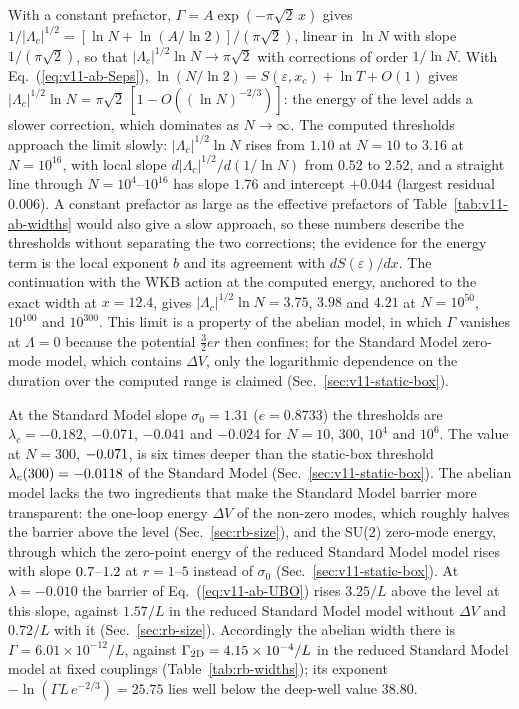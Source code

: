 With a constant prefactor, $\Gamma=A\exp(-\pi\sqrt2\,x)$ gives $1/|\Lambda_c|^{1/2}=[\ln N+\ln(A/\ln2)]/(\pi\sqrt2)$, linear in $\ln N$ with slope $1/(\pi\sqrt2)$, so that $|\Lambda_c|^{1/2}\ln N\to\pi\sqrt2$ with corrections of order $1/\ln N$.
With Eq.~(\ref{eq:v11-ab-Seps}), $\ln(N/\ln2)=S(\varepsilon,x_c)+\ln T+O(1)$ gives $|\Lambda_c|^{1/2}\ln N=\pi\sqrt2\,[1-O((\ln N)^{-2/3})]$: the energy of the level adds a slower correction, which dominates as $N\to\infty$.
The computed thresholds approach the limit slowly: $|\Lambda_c|^{1/2}\ln N$ rises from $1.10$ at $N=10$ to $3.16$ at $N=10^{16}$, with local slope $d|\Lambda_c|^{1/2}/d(1/\ln N)$ from $0.52$ to $2.52$, and a straight line through $N=10^4$--$10^{16}$ has slope $1.76$ and intercept $+0.044$ (largest residual $0.006$). %
A constant prefactor as large as the effective prefactors of Table~\ref{tab:v11-ab-widths} would also give a slow approach, so these numbers describe the thresholds without separating the two corrections; the evidence for the energy term is the local exponent $b$ and its agreement with $dS(\varepsilon)/dx$. %
The continuation with the WKB action at the computed energy, anchored to the exact width at $x=12.4$, gives $|\Lambda_c|^{1/2}\ln N=3.75$, $3.98$ and $4.21$ at $N=10^{50}$, $10^{100}$ and $10^{300}$. %
This limit is a property of the abelian model, in which $\Gamma$ vanishes at $\Lambda=0$ because the potential $\frac32er$ then confines; for the Standard Model zero-mode model, which contains $\Delta V$, only the logarithmic dependence on the duration over the computed range is claimed (Sec.~\ref{sec:v11-static-box}).

At the Standard Model slope $\sigma_0=1.31$ ($e=0.8733$) the thresholds are $\lambda_c=-0.182$, $-0.071$, $-0.041$ and $-0.024$ for $N=10$, $300$, $10^4$ and $10^6$. %
The value at $N=300$, $-0.071$, is six times deeper than the static-box threshold $\lambda_c(300)=-0.0118$ of the Standard Model (Sec.~\ref{sec:v11-static-box}). %
The abelian model lacks the two ingredients that make the Standard Model barrier more transparent: the one-loop energy $\Delta V$ of the non-zero modes, which roughly halves the barrier above the level (Sec.~\ref{sec:rb-size}), and the SU(2) zero-mode energy, through which the zero-point energy of the reduced Standard Model model rises with slope $0.7$--$1.2$ at $r=1$--$5$ instead of $\sigma_0$ (Sec.~\ref{sec:v11-static-box}). %
At $\lambda=-0.010$ the barrier of Eq.~(\ref{eq:v11-ab-UBO}) rises $3.25/L$ above the level at this slope, against $1.57/L$ in the reduced Standard Model model without $\Delta V$ and $0.72/L$ with it (Sec.~\ref{sec:rb-size}). %
Accordingly the abelian width there is $\Gamma=6.01\times10^{-12}/L$, against $\Gamma_{\rm 2D}=4.15\times10^{-4}/L$ in the reduced Standard Model model at fixed couplings (Table~\ref{tab:rb-widths}); its exponent $-\ln(\Gamma L\,e^{-2/3})=25.75$ lies well below the deep-well value $38.80$. %

